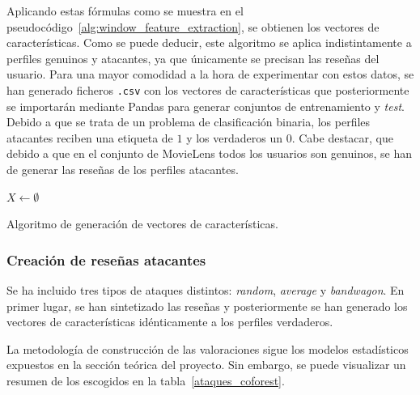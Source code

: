Aplicando estas fórmulas como se muestra en el pseudocódigo~\ref{alg:window_feature_extraction}, se obtienen los vectores de características. Como se puede deducir, este algoritmo se aplica indistintamente a perfiles genuinos y atacantes, ya que únicamente se precisan las reseñas del usuario. Para una mayor comodidad a la hora de experimentar con estos datos, se han generado ficheros \texttt{.csv} con los vectores de características que posteriormente se importarán mediante Pandas para generar conjuntos de entrenamiento y \textit{test}. Debido a que se trata de un problema de clasificación binaria, los perfiles atacantes reciben una etiqueta de $1$ y los verdaderos un $0$. Cabe destacar, que debido a que en el conjunto de MovieLens todos los usuarios son genuinos, se han de generar las reseñas de los perfiles atacantes. 

\begin{algorithm}
	\BlankLine
	$X \leftarrow \emptyset$\\
	\caption{Algoritmo de generación de vectores de características.}
	\label{alg:window_feature_extraction}
\end{algorithm}


\subsubsection{Creación de reseñas atacantes}

Se ha incluido tres tipos de ataques distintos: \textit{random}, \textit{average} y \textit{bandwagon}. En primer lugar, se han sintetizado las reseñas y posteriormente se han generado los vectores de características idénticamente a los perfiles verdaderos.

La metodología de construcción de las valoraciones sigue los modelos estadísticos expuestos en la sección teórica del proyecto. Sin embargo, se puede visualizar un resumen de los escogidos en la tabla~\ref{ataques_coforest}.

